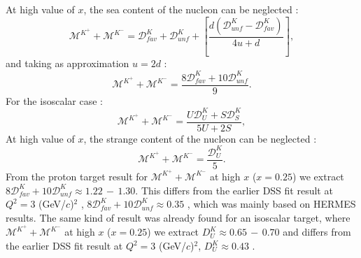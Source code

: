 At high value of $x$, the sea content of the nucleon can be neglected :
%
\begin{equation}
  \mathscr{M}^{K^+}+\mathscr{M}^{K^-} = \mathscr{D}^K_{fav}+\mathscr{D}^K_{unf}+\left[\frac{d\left( \mathscr{D}^K_{unf}-\mathscr{D}^K_{fav} \right)}{4u + d} \right],
\end{equation}
%
and taking as approximation $u=2d$ :
%
\begin{equation}
  \mathscr{M}^{K^+}+\mathscr{M}^{K^-} = \frac{8\mathscr{D}^K_{fav}+10\mathscr{D}^K_{unf}}{9}.
\end{equation}
%
For the isoscalar case :
%
\begin{equation}\label{eq:ksum}
  \mathscr{M}^{K^+}+\mathscr{M}^{K^-} = \frac{U\mathscr{D}^K_U+S\mathscr{D}^K_S}{5U+2S},
\end{equation}
%
At high value of $x$, the strange content of the nucleon can be neglected :
%
\begin{equation}\label{eq:ksum}
  \mathscr{M}^{K^+}+\mathscr{M}^{K^-} = \frac{\mathscr{D}^K_U}{5}.
\end{equation}
%
From the proton target result for $\mathscr{M}^{K^+}+\mathscr{M}^{K^-}$ at high $x$ ($x = 0.25$) we extract $8\mathscr{D}^K_{fav}+10\mathscr{D}^K_{unf} \approx 1.22\,-\,1.30$. This differs from the earlier DSS fit result at $Q^2 = 3$ (GeV/$c$)$^2$ , $8\mathscr{D}^K_{fav}+10\mathscr{D}^K_{unf} \approx 0.35$ \cite{DSS07}, which was mainly based on HERMES results. The same kind of result was already found for an isoscalar target, where $\mathscr{M}^{K^+}+\mathscr{M}^{K^-}$ at high $x$ ($x = 0.25$) we extract $D_U^K \approx 0.65\,-\,0.70$ and differs from the earlier DSS fit result at $Q^2 = 3$ (GeV/$c$)$^2$, $D_U^K \approx 0.43$ \cite{DSS07}.

